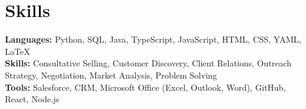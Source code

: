 \documentclass[11pt]{article}       %
\begin{document}
\vspace{-18.5pt}


\section*{Skills}
\textbf{Languages:} Python, SQL, Java, TypeScript, JavaScript, HTML, CSS, YAML, LaTeX\\
\textbf{Skills:} Consultative Selling, Customer Discovery, Client Relations, Outreach Strategy, Negotiation, Market Analysis, Problem Solving\\
\textbf{Tools:} Salesforce, CRM, Microsoft Office (Excel, Outlook, Word), GitHub, React, Node.js\\

\vspace{-6.5pt}
\end{document}
